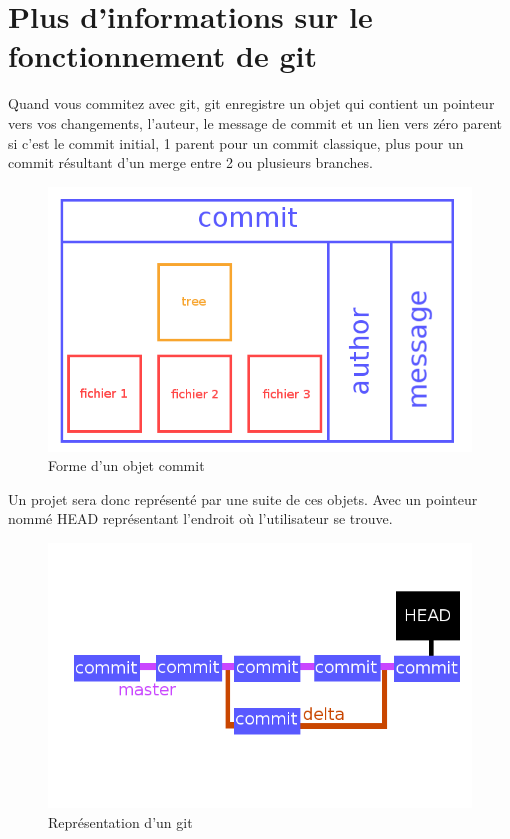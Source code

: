 \documentclass[a4paper,10pt]{report}
\begin{document}
	\section{Plus d'informations sur le fonctionnement de git}
	Quand vous commitez avec git, git enregistre un objet qui contient un pointeur vers vos changements, l'auteur, le message de commit et un lien vers z\'ero parent si c'est le commit initial, 1 parent pour un commit classique, plus pour un commit r\'esultant d'un merge entre 2 ou plusieurs branches.
\begin{figure}[h!]
  \begin{center}
    \includegraphics[scale=0.3]{images/objetcommit}
    \caption{Forme d'un objet commit}
    \label{obCommit}
  \end{center}
\end{figure}
	Un projet sera donc repr\'esent\'e par une suite de ces objets. Avec un pointeur nomm\'e HEAD repr\'esentant l'endroit o\`u l'utilisateur se trouve.
\begin{figure}[h!]
  \begin{center}
    \includegraphics[scale=0.3]{images/git}
    \caption{Repr\'esentation d'un git}
    \label{obgit}
  \end{center}
\end{figure}
\end{document}
